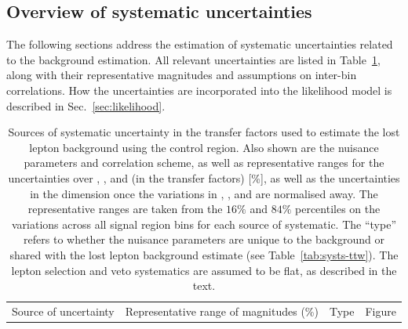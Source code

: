 \subsection{Overview of systematic uncertainties}
\label{sec:systematics-zinv}

The following sections address the estimation of systematic
uncertainties related to the \znunuj background estimation. All
relevant uncertainties are listed in Table~\ref{tab:systs-zinv}, along
with their representative magnitudes and assumptions on inter-bin
correlations. How the uncertainties are incorporated into the
likelihood model is described in Sec.~\ref{sec:likelihood}.

\begin{table}[h!]
  \caption{Sources of systematic uncertainty in the transfer factors
    used to estimate the lost lepton background using the \mj control
    region. Also shown are the nuisance parameters and correlation
    scheme, as well as representative ranges for the uncertainties
    over \njet, \nb, and \scalht (\ie in the transfer factors) [\%],
    as well as the uncertainties in the \mht dimension once the
    variations in \njet, \nb, and \scalht are normalised away. The
    representative ranges are taken from the $16\%$ and $84\%$
    percentiles on the variations across all signal region bins for
    each source of systematic. The ``type'' refers to whether the
    nuisance parameters are unique to the \znunuj background  
    or shared with the lost lepton background estimate
    (see Table~\ref{tab:systs-ttw}). The lepton selection and veto
    systematics are assumed to be flat, as described in the text. 
  }
  \label{tab:systs-zinv}
  \centering
  \fontsize{8}{9.6}\selectfont
  \newcommand{\cat}{\njet, \scalht, \nb, \mht}
  \begin{tabular}{ llllc }
    \hline
    Source of uncertainty & \multicolumn{2}{c}{Representative range of magnitudes (\%)} & Type & Figure \\


\end{tabular}
\end{table}
